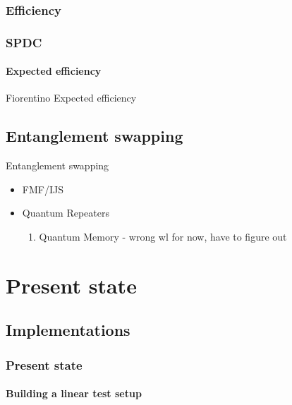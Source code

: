 \documentclass[serif,8pt]{beamer}
\begin{document}
{{\subsubsection{Efficiency}
\begin{frame}
	\frametitle{SPDC}
	\framesubtitle{Expected efficiency}
	Fiorentino
Expected efficiency
\end{frame}

\subsection{Entanglement swapping}
\begin{frame}{Entanglement swapping}
	\begin{itemize}
		\item FMF/IJS
		\item Quantum Repeaters
			\begin{enumerate}
				\item Quantum Memory - wrong wl for now, have to figure out
			\end{enumerate}
	\end{itemize}

\end{frame}

\section{Present state}


\subsection{Implementations}
\begin{frame}[t]
	\frametitle{Present state}
	\framesubtitle{Building a linear test setup}

\end{frame}

}}
\end{document}
